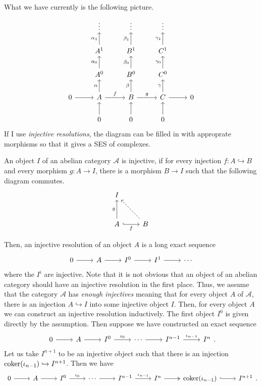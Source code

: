 What we have currently is the following picture.
\[\begin{tikzcd}
    & \vdots & \vdots & \vdots & \\
    & A^{1}\uar{\alpha_{1}} & B^{1}\uar{\beta_{1}} & C^{1}\uar{\gamma_{1}} & \\
    & A^{0}\uar{\alpha_{0}} & B^{0}\uar{\beta_{0}} & C^{0}\uar{\gamma_{0}} & \\
    0\rar& A\rar{f}\uar{\alpha} & B\rar{g}\uar{\beta} & C\rar\uar{\gamma}&0\\
    & 0\uar & 0\uar & 0\uar &
  \end{tikzcd}\]
If I use \emph{injective resolutions}, the diagram can be filled in with
approprate morphisms so that it gives a SES of complexes.
\begin{defin}
  An object $I$ of an abelian category $\mathcal{A}$ is injective,
  if for every injection $f:A\hookrightarrow B$ and every morphism
  $g:A\to I$, there is a morphism $B\to I$ such that the following
  diagram commutes.
  \[\begin{tikzcd}[row sep=large]
      I & \\ A\uar{g}\arrow[r, hook, "f"'] & B\ular[dashed]
    \end{tikzcd}\]
\end{defin}
Then, an injective resolution of an object $A$ is a long exact sequence
\[\begin{tikzcd}
    0\rar & A\rar & I^{0}\rar & I^{1}\rar & \cdots
  \end{tikzcd}\]
where the $I^{i}$ are injective. Note that it is not obvious that an object
of an abelian category should have an injective resolution in the first
place. Thus, we assume that the category $\mathcal{A}$ has
\emph{enough injectives} meaning that for every object $A$ of $\mathcal{A}$,
there is an injection $A\hookrightarrow I$ into some injective object $I$.
Then, for every object $A$ we can construct an injective resolution
inductively. The first object $I^{0}$ is given directly by the assumption.
Then suppose we have constructed an exact sequence
\[\begin{tikzcd}
    0\rar & A\rar & I^{0}\rar{\iota_{0}} & \cdots\rar
    & I^{n-1}\rar{\iota_{n-1}} & I^{n}
  \end{tikzcd}.\]
Let us take $I^{n+1}$ to be an injective object such that there is
an injection ${\operatorname{coker}(\iota_{n-1})\hookrightarrow I^{n+1}}$. Then we have
\[\begin{tikzcd}
    0\rar & A\rar & I^{0}\rar{\iota_{0}} & \cdots\rar
    & I^{n-1}\rar{\iota_{n-1}} & I^{n}\rar[two heads]
    & \coker(\iota_{n-1})\rar[hook] & I^{n+1}
  \end{tikzcd}.\]
